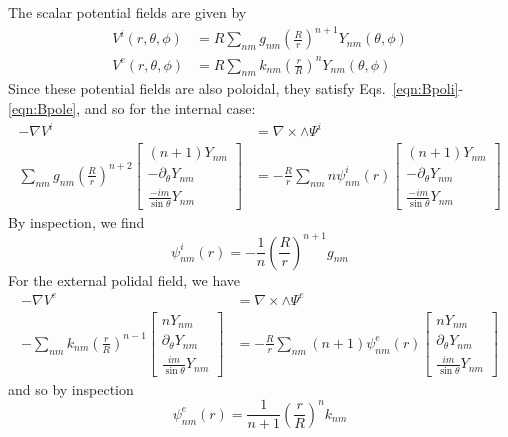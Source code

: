 \documentclass{article}
\begin{document}
The scalar potential fields are given by
\begin{align}
V^i(r,\theta,\phi) &= R \sum_{nm} g_{nm} \left( \frac{R}{r} \right)^{n+1} Y_{nm}(\theta,\phi) \\
V^e(r,\theta,\phi) &= R \sum_{nm} k_{nm} \left( \frac{r}{R} \right)^n Y_{nm}(\theta,\phi)
\end{align}
Since these potential fields are also poloidal, they satisfy
Eqs.~\eqref{eqn:Bpoli}-\eqref{eqn:Bpole}, and so for the internal case:
\begin{align}
-\nabla V^i &= \nabla \times \wedge \Psi^i \\
\sum_{nm} g_{nm} \left( \frac{R}{r} \right)^{n+2}
\left[
\begin{array}{c}
(n+1) Y_{nm} \\
-\partial_{\theta} Y_{nm} \\
\frac{-im}{\sin{\theta}} Y_{nm}
\end{array}
\right]
&=
-\frac{R}{r} \sum_{nm} n \psi_{nm}^i(r)
\left[
\begin{array}{c}
(n+1) Y_{nm} \\
-\partial_{\theta} Y_{nm} \\
\frac{-im}{\sin{\theta}} Y_{nm}
\end{array}
\right]
\end{align}
By inspection, we find
\begin{equation}
\psi_{nm}^i(r) = -\frac{1}{n} \left( \frac{R}{r} \right)^{n+1} g_{nm}
\label{eqn:psi_g}
\end{equation}
For the external polidal field, we have
\begin{align}
-\nabla V^e &= \nabla \times \wedge \Psi^e \\
-\sum_{nm} k_{nm} \left( \frac{r}{R} \right)^{n-1}
\left[
\begin{array}{c}
n Y_{nm} \\
\partial_{\theta} Y_{nm} \\
\frac{im}{\sin{\theta}} Y_{nm}
\end{array}
\right]
&=
-\frac{R}{r} \sum_{nm} (n+1) \psi_{nm}^e(r)
\left[
\begin{array}{c}
n Y_{nm} \\
\partial_{\theta} Y_{nm} \\
\frac{im}{\sin{\theta}} Y_{nm}
\end{array}
\right]
\end{align}
and so by inspection
\begin{equation}
\psi_{nm}^e(r) = \frac{1}{n+1} \left( \frac{r}{R} \right)^n k_{nm}
\end{equation}
\end{document}
